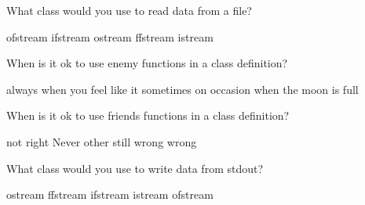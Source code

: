 \documentclass[10pt,answers,addpoints]{exam}
\begin{document}
\begin{questions}
\begin{minipage}{\linewidth}
\end{minipage}


\par\vspace{0.100000in}\begin{minipage}{\linewidth}
\question[2]
What class would you use to read data from a file?
\medskip
\begin{choices}
\choice ofstream
\choice ifstream
\choice ostream
\choice ffstream
\choice istream
\end{choices}
\setlength\answerlinelength{1in}
\answerline[B]

\end{minipage}


\par\vspace{0.100000in}\begin{minipage}{\linewidth}
\question[2]
When is it ok to use enemy functions in a class definition?
\medskip
\begin{choices}
\choice always
\choice when you feel like it
\choice sometimes
\choice on occasion
\choice when the moon is full
\end{choices}
\setlength\answerlinelength{1in}
\answerline[A]

\end{minipage}


\par\vspace{0.100000in}\begin{minipage}{\linewidth}
\question[2]
When is it ok to use friends functions in a class definition?
\medskip
\begin{choices}
\choice not right
\choice Never
\choice other
\choice still wrong
\choice wrong
\end{choices}
\setlength\answerlinelength{1in}
\answerline[B]

\end{minipage}


\par\vspace{0.100000in}\begin{minipage}{\linewidth}
\question[2]
What class would you use to write data from stdout?
\medskip
\begin{choices}
\choice ostream
\choice ffstream
\choice ifstream
\choice istream
\choice ofstream
\end{choices}
\setlength\answerlinelength{1in}
\answerline[A]

\end{minipage}



\end{questions}
\end{document}
